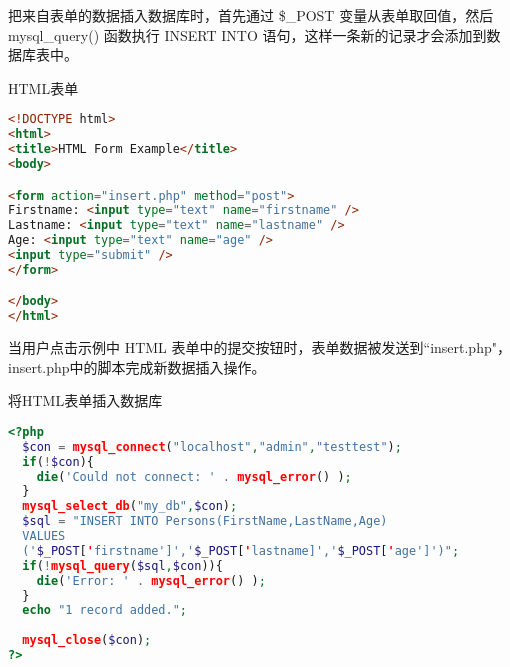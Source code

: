 把来自表单的数据插入数据库时，首先通过 \$\_POST 变量从表单取回值，然后mysql\_query() 函数执行 INSERT INTO 语句，这样一条新的记录才会添加到数据库表中。



\begin{example}
HTML表单
\begin{lstlisting}[language=HTML]
<!DOCTYPE html>
<html>
<title>HTML Form Example</title>
<body>

<form action="insert.php" method="post">
Firstname: <input type="text" name="firstname" />
Lastname: <input type="text" name="lastname" />
Age: <input type="text" name="age" />
<input type="submit" />
</form>

</body>
</html>
\end{lstlisting}
\end{example}

当用户点击示例中 HTML 表单中的提交按钮时，表单数据被发送到``insert.php"，insert.php中的脚本完成新数据插入操作。


\begin{example}
将HTML表单插入数据库
\begin{lstlisting}[language=PHP]
<?php
  $con = mysql_connect("localhost","admin","testtest");
  if(!$con){
    die('Could not connect: ' . mysql_error() );
  }
  mysql_select_db("my_db",$con);
  $sql = "INSERT INTO Persons(FirstName,LastName,Age)
  VALUES
  ('$_POST['firstname']','$_POST['lastname]','$_POST['age']')";
  if(!mysql_query($sql,$con)){
    die('Error: ' . mysql_error() );
  }
  echo "1 record added.";
  
  mysql_close($con);
?>
\end{lstlisting}
\end{example}








\begin{example}

\begin{lstlisting}[language=PHP]

\end{lstlisting}
\end{example}











\begin{example}

\begin{lstlisting}[language=PHP]

\end{lstlisting}
\end{example}










